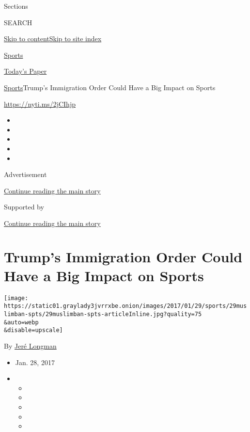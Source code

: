 Sections

SEARCH

\protect\hyperlink{site-content}{Skip to
content}\protect\hyperlink{site-index}{Skip to site index}

\href{https://www.nytimes3xbfgragh.onion/section/sports}{Sports}

\href{https://myaccount.nytimes3xbfgragh.onion/auth/login?response_type=cookie\&client_id=vi}{}

\href{https://www.nytimes3xbfgragh.onion/section/todayspaper}{Today's
Paper}

\href{/section/sports}{Sports}\textbar{}Trump's Immigration Order Could
Have a Big Impact on Sports

\url{https://nyti.ms/2jCIhjp}

\begin{itemize}
\item
\item
\item
\item
\item
\end{itemize}

Advertisement

\protect\hyperlink{after-top}{Continue reading the main story}

Supported by

\protect\hyperlink{after-sponsor}{Continue reading the main story}

\hypertarget{trumps-immigration-order-could-have-a-big-impact-on-sports}{%
\section{Trump's Immigration Order Could Have a Big Impact on
Sports}\label{trumps-immigration-order-could-have-a-big-impact-on-sports}}

\texttt{[image: https://static01.graylady3jvrrxbe.onion/images/2017/01/29/sports/29muslimban-spts/29muslimban-spts-articleInline.jpg?quality=75\\\&auto=webp\\\&disable=upscale]}

By \href{https://www.nytimes3xbfgragh.onion/by/jere-longman}{Jeré
Longman}

\begin{itemize}
\item
  Jan. 28, 2017
\item
  \begin{itemize}
  \item
  \item
  \item
  \item
  \item
  \end{itemize}
\end{itemize}

